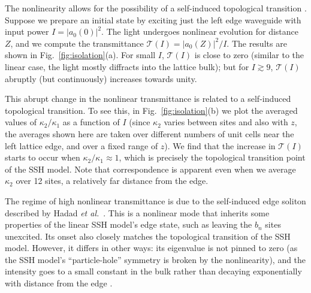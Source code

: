 \documentclass[aps,prx,twocolumn,superscriptaddress]{revtex4-1}
\begin{document}
The nonlinearity allows for the possibility of a self-induced topological transition \cite{alu2016}.  Suppose we prepare an initial state by exciting just the left edge waveguide with input power $I = |a_0(0)|^2$.  The light undergoes nonlinear evolution for distance $Z$, and we compute the transmittance $\mathcal{T}(I) = |a_0(Z)|^2/I$.  The results are shown in Fig.~\ref{fig:isolation}(a).  For small $I$, $\mathcal{T}(I)$ is close to zero (similar to the linear case, the light mostly diffracts into the lattice bulk); but for $I \gtrsim 9$, $\mathcal{T}(I)$ abruptly (but continuously) increases towards unity.

This abrupt change in the nonlinear transmittance is related to a self-induced topological transition. To see this, in Fig.~\ref{fig:isolation}(b) we plot the averaged values of $\kappa_2/\kappa_1$ as a function of $I$ (since $\kappa_2$ varies between sites and also with $z$, the averages shown here are taken over different numbers of unit cells near the left lattice edge, and over a fixed range of $z$).  We find that the increase in $\mathcal{T}(I)$ starts to occur when $\kappa_2/\kappa_1 \approx 1$, which is precisely the topological transition point of the SSH model.  Note that correspondence is apparent even when we average $\kappa_2$ over 12 sites, a relatively far distance from the edge.

The regime of high nonlinear transmittance is due to the self-induced edge soliton described by Hadad \textit{et al.}~\cite{alu2016}.  This is a nonlinear mode that inherits some properties of the linear SSH model's edge state, such as leaving the $b_n$ sites unexcited.  Its onset also closely matches the topological transition of the SSH model. However, it differs in other ways: its eigenvalue is not pinned to zero (as the SSH model's ``particle-hole'' symmetry is broken by the nonlinearity), and the intensity goes to a small constant in the bulk rather than decaying exponentially with distance from the edge \cite{alu2016}. 
\end{document}
